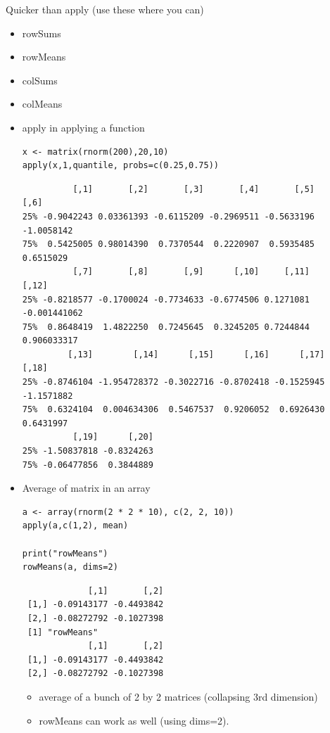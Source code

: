 \documentclass[11pt]{article}
\begin{document}
Quicker than apply (use these where you can)
\begin{itemize}
\item rowSums
\item rowMeans
\item colSums
\item colMeans
\end{itemize}
\begin{itemize}

\item apply in applying a function\\
\label{sec-2-4-4-1}%
\begin{verbatim}
x <- matrix(rnorm(200),20,10)
apply(x,1,quantile, probs=c(0.25,0.75))
\end{verbatim}


\begin{verbatim}
          [,1]       [,2]       [,3]       [,4]       [,5]       [,6]
25% -0.9042243 0.03361393 -0.6115209 -0.2969511 -0.5633196 -1.0058142
75%  0.5425005 0.98014390  0.7370544  0.2220907  0.5935485  0.6515029
          [,7]       [,8]       [,9]      [,10]     [,11]        [,12]
25% -0.8218577 -0.1700024 -0.7734633 -0.6774506 0.1271081 -0.001441062
75%  0.8648419  1.4822250  0.7245645  0.3245205 0.7244844  0.906033317
         [,13]        [,14]      [,15]      [,16]      [,17]      [,18]
25% -0.8746104 -1.954728372 -0.3022716 -0.8702418 -0.1525945 -1.1571882
75%  0.6324104  0.004634306  0.5467537  0.9206052  0.6926430  0.6431997
          [,19]      [,20]
25% -1.50837818 -0.8324263
75% -0.06477856  0.3844889
\end{verbatim}


\item Average of matrix in an array\\
\label{sec-2-4-4-2}%
\begin{verbatim}
a <- array(rnorm(2 * 2 * 10), c(2, 2, 10))
apply(a,c(1,2), mean)

print("rowMeans")
rowMeans(a, dims=2)
\end{verbatim}

\begin{verbatim}
             [,1]       [,2]
 [1,] -0.09143177 -0.4493842
 [2,] -0.08272792 -0.1027398
 [1] "rowMeans"
             [,1]       [,2]
 [1,] -0.09143177 -0.4493842
 [2,] -0.08272792 -0.1027398
\end{verbatim}

\begin{itemize}
\item average of a bunch of 2 by 2 matrices (collapsing 3rd dimension)
\item rowMeans can work as well (using dims=2).
\end{itemize}



\end{itemize}
\end{document}
